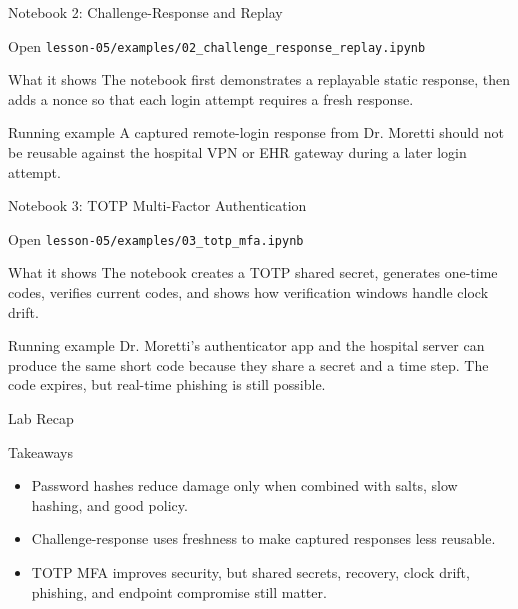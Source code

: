 \documentclass[presentation]{beamer}
\begin{document}
\begin{frame}[c]{Notebook 2: Challenge-Response and Replay}
\begin{block}{Open}
\texttt{lesson-05/examples/02\_challenge\_response\_replay.ipynb}
\end{block}

\begin{block}{What it shows}
The notebook first demonstrates a replayable static response, then adds a nonce so that each login
attempt requires a fresh response.
\end{block}

\begin{exampleblock}{Running example}
A captured remote-login response from Dr. Moretti should not be reusable against the hospital VPN
or EHR gateway during a later login attempt.
\end{exampleblock}
\end{frame}

\begin{frame}[c]{Notebook 3: TOTP Multi-Factor Authentication}
\begin{block}{Open}
\texttt{lesson-05/examples/03\_totp\_mfa.ipynb}
\end{block}

\begin{block}{What it shows}
The notebook creates a TOTP shared secret, generates one-time codes, verifies current codes, and
shows how verification windows handle clock drift.
\end{block}

\begin{exampleblock}{Running example}
Dr. Moretti's authenticator app and the hospital server can produce the same short code because
they share a secret and a time step. The code expires, but real-time phishing is still possible.
\end{exampleblock}
\end{frame}

\begin{frame}[c]{Lab Recap}
\begin{block}{Takeaways}
\begin{itemize}
    \item Password hashes reduce damage only when combined with salts, slow hashing, and good policy.
    \item Challenge-response uses freshness to make captured responses less reusable.
    \item TOTP MFA improves security, but shared secrets, recovery, clock drift, phishing, and endpoint
    compromise still matter.
\end{itemize}
\end{block}
\end{frame}
\end{document}
